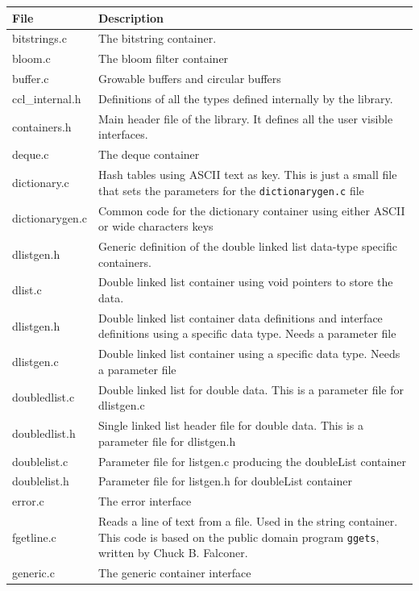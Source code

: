 \documentclass[12pt,a4paper]{memoir} %
\begin{document}
{{{\small
\begin{longtable}{||p{3.5cm}|p{11cm}||}
\hline
\textbf{File}&\textbf{Description}\\\hline \hline 
bitstrings.c&The bitstring container.\\\hline
bloom.c&The bloom filter container\\\hline
buffer.c&Growable buffers and circular buffers\\\hline
ccl\_internal.h&Definitions of all the types defined internally by the library.\\\hline
containers.h&Main header file of the library. It defines all the user visible interfaces.\\\hline
deque.c&The deque container\\\hline
dictionary.c&Hash tables using ASCII text as key. This is just a small file that sets the parameters for the \verb,dictionarygen.c, file\\\hline
dictionarygen.c&Common code for the dictionary container using either ASCII or wide characters keys\\\hline
dlistgen.h&Generic definition of the double linked list data-type specific containers.\\\hline
dlist.c&Double linked list container using void pointers to store the data.\\\hline
dlistgen.h&Double linked list container data definitions and interface definitions using a specific data type. Needs a parameter file\\\hline
dlistgen.c&Double linked list container using a specific data type. Needs a parameter file\\\hline
doubledlist.c&Double linked list for double data. This is a parameter file for dlistgen.c\\\hline
doubledlist.h&Single linked list header file for double data. This is a parameter file for dlistgen.h\\\hline
doublelist.c& Parameter file for listgen.c producing the doubleList container\\\hline
doublelist.h&Parameter file for listgen.h for doubleList container\\\hline
error.c&The error interface\\\hline
fgetline.c&Reads a line of text from a file. Used in the string container. This code is based on the public 
domain program \verb,ggets,, written by Chuck B. Falconer.\\\hline
generic.c&The generic container interface\\\hline

\end{longtable}}}}
\end{document}
